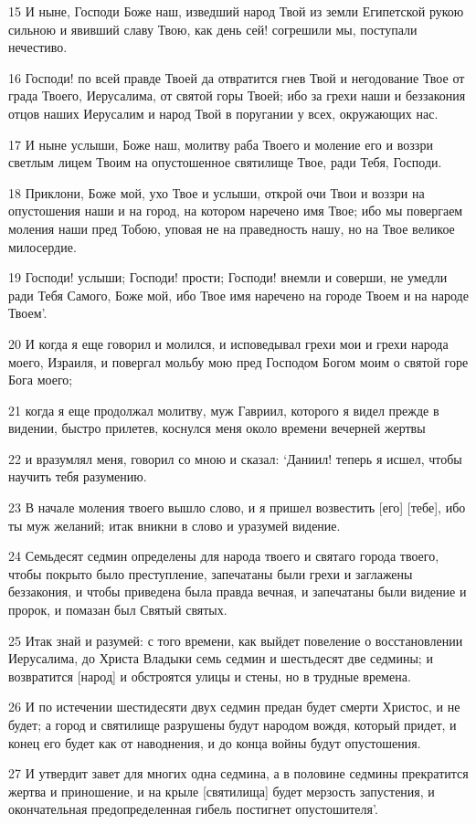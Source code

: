 \par 15 И ныне, Господи Боже наш, изведший народ Твой из земли Египетской рукою сильною и явивший славу Твою, как день сей! согрешили мы, поступали нечестиво.
\par 16 Господи! по всей правде Твоей да отвратится гнев Твой и негодование Твое от града Твоего, Иерусалима, от святой горы Твоей; ибо за грехи наши и беззакония отцов наших Иерусалим и народ Твой в поругании у всех, окружающих нас.
\par 17 И ныне услыши, Боже наш, молитву раба Твоего и моление его и воззри светлым лицем Твоим на опустошенное святилище Твое, ради Тебя, Господи.
\par 18 Приклони, Боже мой, ухо Твое и услыши, открой очи Твои и воззри на опустошения наши и на город, на котором наречено имя Твое; ибо мы повергаем моления наши пред Тобою, уповая не на праведность нашу, но на Твое великое милосердие.
\par 19 Господи! услыши; Господи! прости; Господи! внемли и соверши, не умедли ради Тебя Самого, Боже мой, ибо Твое имя наречено на городе Твоем и на народе Твоем'.
\par 20 И когда я еще говорил и молился, и исповедывал грехи мои и грехи народа моего, Израиля, и повергал мольбу мою пред Господом Богом моим о святой горе Бога моего;
\par 21 когда я еще продолжал молитву, муж Гавриил, которого я видел прежде в видении, быстро прилетев, коснулся меня около времени вечерней жертвы
\par 22 и вразумлял меня, говорил со мною и сказал: `Даниил! теперь я исшел, чтобы научить тебя разумению.
\par 23 В начале моления твоего вышло слово, и я пришел возвестить [его] [тебе], ибо ты муж желаний; итак вникни в слово и уразумей видение.
\par 24 Семьдесят седмин определены для народа твоего и святаго города твоего, чтобы покрыто было преступление, запечатаны были грехи и заглажены беззакония, и чтобы приведена была правда вечная, и запечатаны были видение и пророк, и помазан был Святый святых.
\par 25 Итак знай и разумей: с того времени, как выйдет повеление о восстановлении Иерусалима, до Христа Владыки семь седмин и шестьдесят две седмины; и возвратится [народ] и обстроятся улицы и стены, но в трудные времена.
\par 26 И по истечении шестидесяти двух седмин предан будет смерти Христос, и не будет; а город и святилище разрушены будут народом вождя, который придет, и конец его будет как от наводнения, и до конца войны будут опустошения.
\par 27 И утвердит завет для многих одна седмина, а в половине седмины прекратится жертва и приношение, и на крыле [святилища] будет мерзость запустения, и окончательная предопределенная гибель постигнет опустошителя'.

